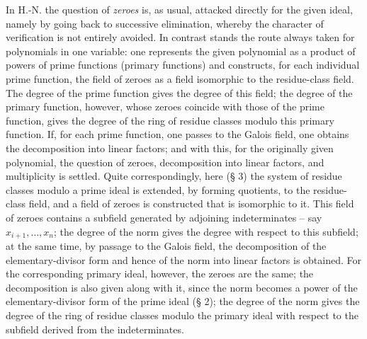 \documentclass[11pt]{article}
\begin{document}
In H.-N. the question of \emph{zeroes} is, as usual, attacked directly for the given ideal, namely by going back to successive elimination, whereby the character of verification is not entirely avoided. In contrast stands the route always taken for polynomials in one variable: one represents the given polynomial as a product of powers of prime functions (primary functions) and constructs, for each individual prime function, the field of zeroes as a field isomorphic to the residue-class field. The degree of the prime function gives the degree of this field; the degree of the primary function, however, whose zeroes coincide with those of the prime function, gives the degree of the ring of residue classes modulo this primary function. If, for each prime function, one passes to the Galois field, one obtains the decomposition into linear factors; and with this, for the originally given polynomial, the question of zeroes, decomposition into linear factors, and multiplicity is settled. Quite correspondingly, here (§ 3) the system of residue classes modulo a prime ideal is extended, by forming quotients, to the residue-class field, and a field of zeroes is constructed that is isomorphic to it. This field of zeroes contains a subfield generated by adjoining indeterminates -- say $x_{i+1},\ldots,x_n$; the degree of the norm gives the degree with respect to this subfield; at the same time, by passage to the Galois field, the decomposition of the elementary-divisor form and hence of the norm into linear factors is obtained. For the corresponding primary ideal, however, the zeroes are the same; the decomposition is also given along with it, since the norm becomes a power of the elementary-divisor form of the prime ideal (§ 2); the degree of the norm gives the degree of the ring of residue classes modulo the primary ideal with respect to the subfield derived from the indeterminates.
\end{document}
